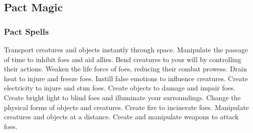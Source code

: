 \small
\subsection{Pact Magic}\label{Pact Magic}
\subsubsection{Pact Spells}\label{Pact Spells}
\begin{spelllist}
 Transport creatures and objects instantly through space.
 Manipulate the passage of time to inhibit foes and aid allies.
 Bend creatures to your will by controlling their actions.
 Weaken the life force of foes, reducing their combat prowess.
 Drain heat to injure and freeze foes.
 Instill false emotions to influence creatures.
 Create electricity to injure and stun foes.
 Create objects to damage and impair foes.
 Create bright light to blind foes and illuminate your surroundings.
 Change the physical forms of objects and creatures.
 Create fire to incinerate foes.
 Manipulate creatures and objects at a distance.
 Create and manipulate weapons to attack foes.
\end{spelllist}

